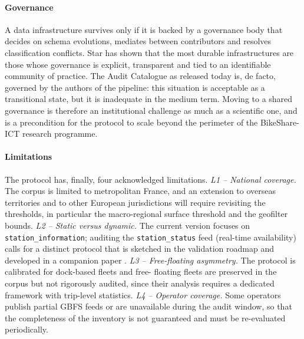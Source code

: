 \documentclass[a4paper,twoside]{article}
\begin{document}
\paragraph{Governance}
A data infrastructure survives only if it is backed by a
governance body that decides on schema evolutions, mediates
between contributors and resolves classification conflicts. Star
\cite{Star2010} has shown that the most durable infrastructures
are those whose governance is explicit, transparent and tied to
an identifiable community of practice. The Audit Catalogue as
released today is, de facto, governed by the authors of the
pipeline: this situation is acceptable as a transitional state,
but it is inadequate in the medium term. Moving to a shared
governance is therefore an institutional challenge as much as a
scientific one, and is a precondition for the protocol to scale
beyond the perimeter of the BikeShare-ICT research programme.

\paragraph{Limitations}
The protocol has, finally, four acknowledged limitations.
\emph{L1 -- National coverage.} The corpus is limited to
metropolitan France, and an extension to overseas territories
and to other European jurisdictions will require revisiting the
thresholds, in particular the macro-regional surface threshold
and the geofilter bounds. \emph{L2 -- Static versus dynamic.}
The current version focuses on \texttt{station\_information};
auditing the \texttt{station\_status} feed (real-time
availability) calls for a distinct protocol that is sketched in
the validation roadmap and developed in a companion paper
\cite{Fosse2026flows}. \emph{L3 -- Free-floating asymmetry.}
The protocol is calibrated for dock-based fleets and free-
floating fleets are preserved in the corpus but not rigorously
audited, since their analysis requires a dedicated framework with
trip-level statistics. \emph{L4 -- Operator coverage.} Some
operators publish partial GBFS feeds or are unavailable during
the audit window, so that the completeness of the inventory is
not guaranteed and must be re-evaluated periodically.
\end{document}

